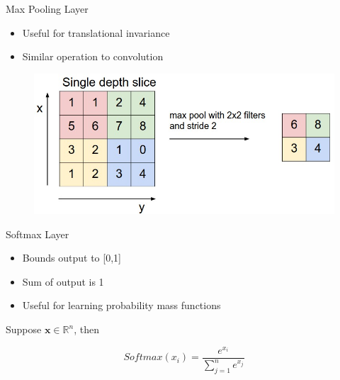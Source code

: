 \documentclass{beamer}
\begin{document}
\begin{frame}{Max Pooling Layer}
    \begin{itemize}
        \item Useful for translational invariance
        \item Similar operation to convolution
    \end{itemize}


    \begin{figure}
        \includegraphics[width=\textwidth]{maxpool}
    \end{figure}
\end{frame}

\begin{frame}{Softmax Layer}
    \begin{itemize}
        \item Bounds output to [0,1]
        \item Sum of output is 1
        \item Useful for learning probability mass functions
    \end{itemize}

    Suppose $\mathbf{x} \in \mathbb{R}^n$, then 

    \[
        Softmax(x_i) = \frac{e^{x_i}}{\sum_{j=1}^{n} e^{x_j}}
    \]

\end{frame}
\end{document}
